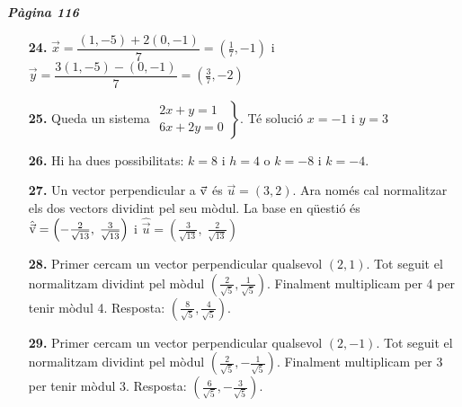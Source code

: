 \documentclass[a4paper, pdf, twoside]{book}
\begin{document}
\begin{multicols}{2}
{\textbf{\em Pàgina 116}} \hrulefill
\begin{enumerate}
\vspace{0.25cm}
\item[\fontfamily{phv}\selectfont\color{blue}\textbf{24. }] 
$\vec x = \dfrac {(1,-5)+2(0,-1)}{7}=(\frac {1}{7},-1)$ i $\vec y = \dfrac {3(1,-5)-(0,-1)}{7}=(\frac {3}{7},-2)$ 
 \end{enumerate}
\begin{enumerate}
\vspace{0.25cm}
\item[\fontfamily{phv}\selectfont\color{blue}\textbf{25. }] 
Queda un sistema $\left . \begin {array}{l} 2x+y=1 \\ 6x+2y=0 \end {array} \right \}$. Té solució $x=-1$ i $y=3$
\vspace{0.25cm}
\item[\fontfamily{phv}\selectfont\color{blue}\textbf{26. }] 
Hi ha dues possibilitats: $k=8$ i $h=4$ o $k=-8$ i $k=-4$.
\vspace{0.25cm}
\item[\fontfamily{phv}\selectfont\color{blue}\textbf{27. }] 
Un vector perpendicular a $\vec{\mathrm{v}} $ és $\vec u=(3, 2)$. Ara només cal normalitzar els dos vectors dividint pel seu mòdul. La base en qüestió és $\hat {\vec{\mathrm{v}} }=\left (-\frac {2}{\sqrt {13}},\; \frac {3}{\sqrt {13}}\right )$ i $\hat {\vec u}=\left (\frac {3}{\sqrt {13}},\; \frac {2}{\sqrt {13}}\right )$ 
\vspace{0.25cm}
\item[\fontfamily{phv}\selectfont\color{blue}\textbf{28. }] 
Primer cercam un vector perpendicular qualsevol $(2,1)$. Tot seguit el normalitzam dividint pel mòdul $(\frac {2}{\sqrt {5}}, \frac {1}{\sqrt {5}})$. Finalment multiplicam per 4 per tenir mòdul 4. Resposta: $(\frac {8}{\sqrt {5}}, \frac {4}{\sqrt {5}})$.
\vspace{0.25cm}
\item[\fontfamily{phv}\selectfont\color{blue}\textbf{29. }] 
Primer cercam un vector perpendicular qualsevol $(2,-1)$. Tot seguit el normalitzam dividint pel mòdul $(\frac {2}{\sqrt {5}}, -\frac {1}{\sqrt {5}})$. Finalment multiplicam per 3 per tenir mòdul 3. Resposta: $(\frac {6}{\sqrt {5}}, -\frac {3}{\sqrt {5}})$.
\vspace{0.25cm}




\end{enumerate}
\end{multicols}
\end{document}
